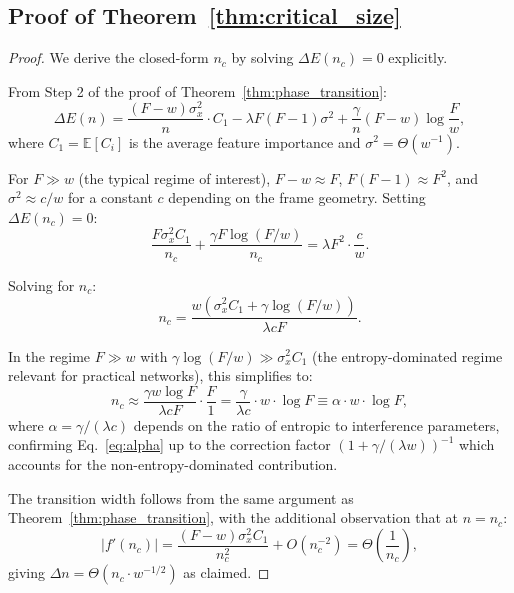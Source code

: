 \documentclass{article}
\newcommand{\nc}{n_c}
\newcommand{\expect}{\mathbb{E}}
\newcommand{\Fnum}{F}
\begin{document}
\subsection{Proof of Theorem~\ref{thm:critical_size}}

\begin{proof}
We derive the closed-form $\nc$ by solving $\Delta E(\nc) = 0$ explicitly.

From Step 2 of the proof of Theorem~\ref{thm:phase_transition}:
\begin{equation}
\Delta E(n) = \frac{(\Fnum - w) \sigma_x^2}{n} \cdot C_1 - \lambda \Fnum(\Fnum - 1) \sigma^2 + \frac{\gamma}{n}(\Fnum - w)\log\frac{\Fnum}{w},
\end{equation}
where $C_1 = \expect[C_i]$ is the average feature importance and $\sigma^2 = \Theta(w^{-1})$.

For $\Fnum \gg w$ (the typical regime of interest), $\Fnum - w \approx \Fnum$, $\Fnum(\Fnum - 1) \approx \Fnum^2$, and $\sigma^2 \approx c / w$ for a constant $c$ depending on the frame geometry.
Setting $\Delta E(\nc) = 0$:
\begin{equation}
\frac{\Fnum \sigma_x^2 C_1}{\nc} + \frac{\gamma \Fnum \log(\Fnum/w)}{\nc} = \lambda \Fnum^2 \cdot \frac{c}{w}.
\end{equation}

Solving for $\nc$:
\begin{equation}
\nc = \frac{w(\sigma_x^2 C_1 + \gamma \log(\Fnum/w))}{\lambda c \Fnum}.
\end{equation}

In the regime $\Fnum \gg w$ with $\gamma \log(\Fnum/w) \gg \sigma_x^2 C_1$ (the entropy-dominated regime relevant for practical networks), this simplifies to:
\begin{equation}
\nc \approx \frac{\gamma w \log \Fnum}{\lambda c \Fnum} \cdot \frac{\Fnum}{1} = \frac{\gamma}{\lambda c} \cdot w \cdot \log \Fnum \equiv \alpha \cdot w \cdot \log \Fnum,
\end{equation}
where $\alpha = \gamma / (\lambda c)$ depends on the ratio of entropic to interference parameters, confirming Eq.~\eqref{eq:alpha} up to the correction factor $(1 + \gamma/(\lambda w))^{-1}$ which accounts for the non-entropy-dominated contribution.

The transition width follows from the same argument as Theorem~\ref{thm:phase_transition}, with the additional observation that at $n = \nc$:
\begin{equation}
|f'(\nc)| = \frac{(\Fnum - w)\sigma_x^2 C_1}{\nc^2} + O(\nc^{-2}) = \Theta\left(\frac{1}{\nc}\right),
\end{equation}
giving $\Delta n = \Theta(\nc \cdot w^{-1/2})$ as claimed.
\end{proof}
\end{document}
